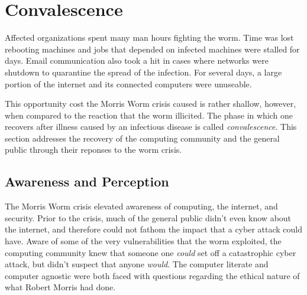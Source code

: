 \section*{Convalescence}

Affected organizations spent many man hours fighting the worm. Time was lost
rebooting machines and jobs that depended on infected machines were stalled for days.
Email communication also took a hit in cases where networks were shutdown to
quarantine the spread of the infection\cite{seeley_tour_1989}. For several days,
a large portion of the internet and its connected computers were unuseable.

This opportunity cost the Morris Worm crisis caused is rather shallow, however,
when compared to the reaction that the worm illicited. The phase in which one
recovers after illness caused by an infectious disease is called \textit{convalescence}. This
section addresses the recovery of the computing community and the
general public through their reponses to the worm crisis.

\subsection*{Awareness and Perception}
The Morris Worm crisis elevated awareness of computing, the internet, and
security. Prior to the crisis, much of the general public didn't even
know about the internet, and therefore could not fathom the impact that a
cyber attack could have. Aware of some of the very
vulnerabilities that the worm exploited, the computing community knew that
someone one \textit{could} set off a catastrophic cyber attack, but didn't
suspect that anyone \textit{would}. The computer literate and computer agnostic
were both faced with questions regarding the ethical nature of what Robert
Morris had done.

